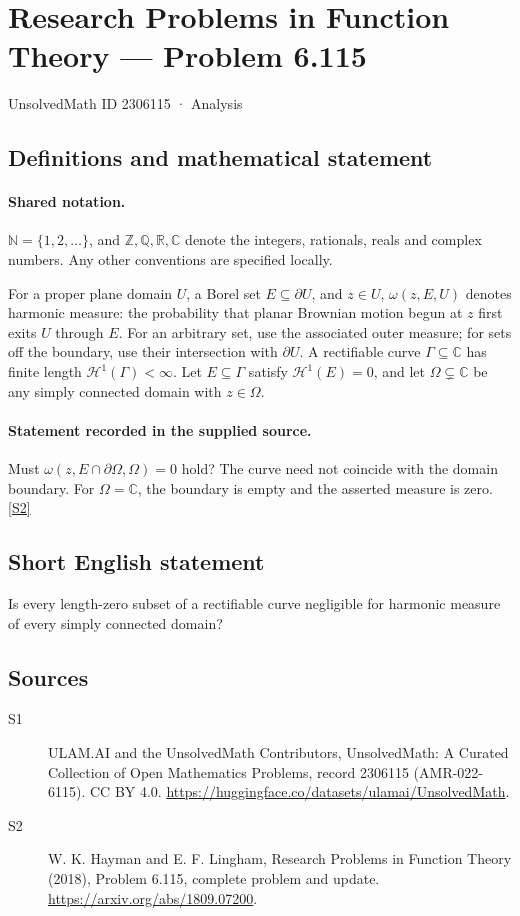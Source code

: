 \documentclass[11pt]{article}
\newcommand{\sref}[2]{\hyperlink{source:#1:#2}{[S#2]}}
\begin{document}
\setcounter{section}{2306114}
\section{Research Problems in Function Theory — Problem 6.115}\label{2306115}
{\small\sffamily UnsolvedMath ID 2306115 · Analysis}
\subsection{Definitions and mathematical statement}

\paragraph{Shared notation.}$\mathbb N=\{1,2,\ldots\}$, and $\mathbb Z,\mathbb Q,\mathbb R,\mathbb C$ denote the integers, rationals, reals and complex numbers. Any other conventions are specified locally.


For a proper plane domain $U$, a Borel set $E\subseteq\partial U$, and $z\in U$, $\omega(z,E,U)$ denotes harmonic measure: the probability that planar Brownian motion begun at $z$ first exits $U$ through $E$. For an arbitrary set, use the associated outer measure; for sets off the boundary, use their intersection with $\partial U$.
A rectifiable curve $\Gamma\subseteq\mathbb C$ has finite length $\mathcal H^1(\Gamma)<\infty$. Let $E\subseteq\Gamma$ satisfy $\mathcal H^1(E)=0$, and let $\Omega\subsetneq\mathbb C$ be any simply connected domain with $z\in\Omega$.
\paragraph{Statement recorded in the supplied source.}
Must $\omega(z,E\cap\partial\Omega,\Omega)=0$ hold? The curve need not coincide with the domain boundary. For $\Omega=\mathbb C$, the boundary is empty and the asserted measure is zero. \sref{2306115}{2}
\subsection{Short English statement}
Is every length-zero subset of a rectifiable curve negligible for harmonic measure of every simply connected domain?
\subsection{Sources}
\begin{description}
\item[\hypertarget{source:2306115:1}{S1}] ULAM.AI and the UnsolvedMath Contributors, UnsolvedMath: A Curated Collection of Open Mathematics Problems, record 2306115 (AMR-022-6115). CC BY 4.0. \url{https://huggingface.co/datasets/ulamai/UnsolvedMath}.
\item[\hypertarget{source:2306115:2}{S2}] W. K. Hayman and E. F. Lingham, Research Problems in Function Theory (2018), Problem 6.115, complete problem and update. \url{https://arxiv.org/abs/1809.07200}.
\end{description}
\label{end:2306115}
\end{document}
